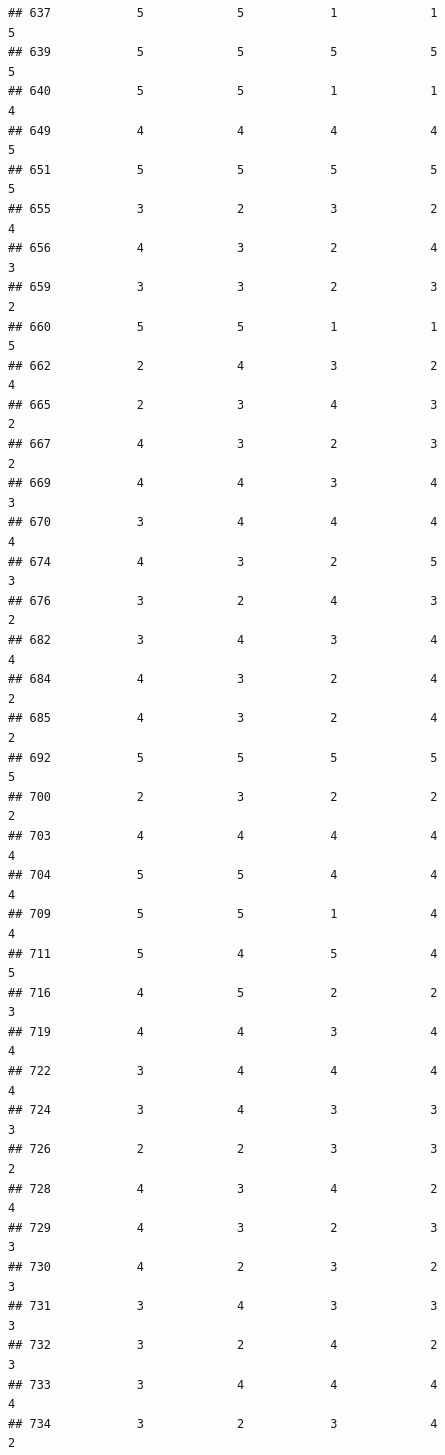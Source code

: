 \documentclass[
]{article}
\begin{document}
\begin{verbatim}
## 637            5             5            1             1          5
## 639            5             5            5             5          5
## 640            5             5            1             1          4
## 649            4             4            4             4          5
## 651            5             5            5             5          5
## 655            3             2            3             2          4
## 656            4             3            2             4          3
## 659            3             3            2             3          2
## 660            5             5            1             1          5
## 662            2             4            3             2          4
## 665            2             3            4             3          2
## 667            4             3            2             3          2
## 669            4             4            3             4          3
## 670            3             4            4             4          4
## 674            4             3            2             5          3
## 676            3             2            4             3          2
## 682            3             4            3             4          4
## 684            4             3            2             4          2
## 685            4             3            2             4          2
## 692            5             5            5             5          5
## 700            2             3            2             2          2
## 703            4             4            4             4          4
## 704            5             5            4             4          4
## 709            5             5            1             4          4
## 711            5             4            5             4          5
## 716            4             5            2             2          3
## 719            4             4            3             4          4
## 722            3             4            4             4          4
## 724            3             4            3             3          3
## 726            2             2            3             3          2
## 728            4             3            4             2          4
## 729            4             3            2             3          3
## 730            4             2            3             2          3
## 731            3             4            3             3          3
## 732            3             2            4             2          3
## 733            3             4            4             4          4
## 734            3             2            3             4          2

\end{verbatim}
\end{document}
